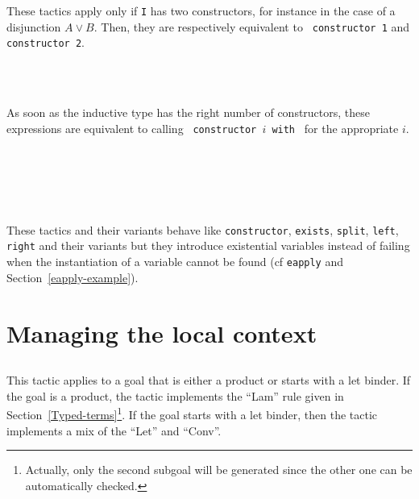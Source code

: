 \begin{Variants}
  These tactics apply only if {\tt I} has two constructors, for instance
  in the case of a
  disjunction $A\lor B$. Then, they are respectively equivalent to {\tt
    constructor 1} and {\tt constructor 2}.

  \ErrMsg {}

\item {}\\
      {}\\
      {}

  As soon as the inductive type has the right number of constructors,
    these expressions are equivalent to calling {\tt
    constructor $i$ with \bindinglist} for the appropriate $i$.

\item {}\\
      {}\\
      {}\\
      {}\\
      {}

  These tactics and their variants behave like \texttt{constructor},
  \texttt{exists}, \texttt{split}, \texttt{left}, \texttt{right} and
  their variants but they introduce existential variables instead of
  failing when the instantiation of a variable cannot be found (cf
  \texttt{eapply} and Section~\ref{eapply-example}).

\end{Variants}

\section{Managing the local context}

\subsection{}
\label{intro}

This tactic applies to a goal that is either a product or starts with
a let binder. If the goal is a product, the tactic implements the
``Lam'' rule given in
Section~\ref{Typed-terms}\footnote{Actually, only the second subgoal will be
generated since the other one can be automatically checked.}.  If the
goal starts with a let binder, then the tactic implements a mix of the
``Let'' and ``Conv''.

